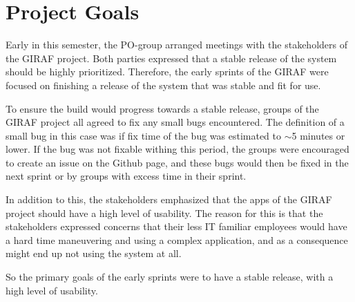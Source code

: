 \section{Project Goals} %
\label{sect:ProjectGoals}

Early in this semester, the PO-group arranged meetings with the stakeholders of the GIRAF project. Both parties expressed that a stable release of the system should be highly prioritized. Therefore, the early sprints of the GIRAF were focused on finishing a release of the system that was stable and fit for use.

To ensure the build would progress towards a stable release, groups of the GIRAF project all agreed to fix any small bugs encountered. The definition of a small bug in this case was if fix time of the bug was estimated to $\sim$5 minutes or lower. If the bug was not fixable withing this period, the groups were encouraged to create an issue on the Github page, and these bugs would then be fixed in the next sprint or by groups with excess time in their sprint.

In addition to this, the stakeholders emphasized that the apps of the GIRAF project should have a high level of usability. The reason for this is that the stakeholders expressed concerns that their less IT familiar employees would have a hard time maneuvering and using a complex application, and as a consequence might end up not using the system at all.

So the primary goals of the early sprints were to have a stable release, with a high level of usability.


